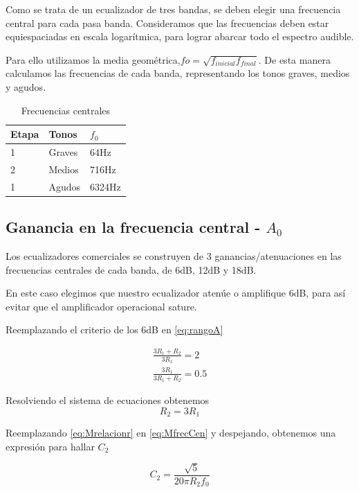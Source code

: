 \documentclass[../../tc_tp3_main.tex]{subfiles}
\begin{document}
Como se trata de un ecualizador de tres bandas, se deben elegir una frecuencia central para cada  pasa banda. Consideramos que las frecuencias deben estar equiespaciadas en escala logarítmica, para lograr abarcar todo el espectro audible.\par
Para ello utilizamos la media geométrica,$fo=\sqrt{f_{inicial}f_{final}}$. De esta manera calculamos las frecuencias de cada banda, representando los tonos graves, medios y agudos.
\begin{table}[h]
\begin{center}
\begin{tabular}{|l|l|l|}
\hline
Etapa & Tonos & $f_0$ \\
\hline \hline
1&Graves  &64Hz \\ \hline
2&Medios  &716Hz \\ \hline
1&Agudos  &6324Hz \\ \hline

\end{tabular}
\caption{Frecuencias centrales} 
\label{tab:MFc}
\end{center}
\end{table}

\subsection{Ganancia en la frecuencia central - $A_0$}

Los ecualizadores comerciales se construyen de 3 ganancias/atenuaciones en las frecuencias centrales de cada banda, de 6dB, 12dB y 18dB.\par
En este caso elegimos que nuestro ecualizador aten\'ue o amplifique 6dB, para así evitar que el amplificador operacional sature.
\par 
Reemplazando el criterio de los 6dB en \ref{eq:rangoA}

\begin{gather}
 \frac{3R_1 + R_2}{3R_1}=2\\
\frac {3R_1}{3R_1 + R_2} =0.5
\end{gather}

Resolviendo el sistema de ecuaciones obtenemos
\begin{equation}
R_2=3R_1 \label{eq:Mrelacionr}
\end{equation}

Reemplazando \ref{eq:Mrelacionr} en \ref{eq:MfrecCen} y despejando, obtenemos una expresi\'on para hallar $C_2$

\begin{equation}
C_2=\frac{\sqrt{5}}{20 \pi R_2 f_0}
\end{equation}
\end{document}
